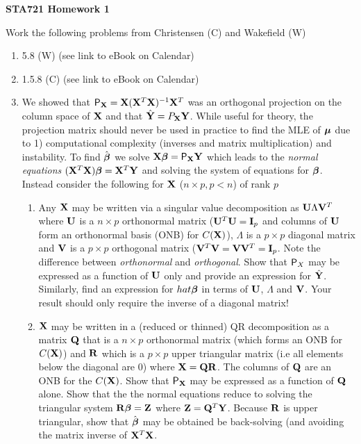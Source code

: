 \documentclass[12pt]{article}
\begin{document}
{\bf STA721 \hfill Homework 1}

\vspace{.5in}
\noindent
Work the following problems from Christensen (C) and Wakefield (W)
\begin{enumerate}
\item 5.8 (W)  (see link to eBook on Calendar)
\item 1.5.8 (C) (see link to eBook on Calendar)

\item We showed that $\P_\X = \X(\X^T\X)^{-1}\X^T$ was an orthogonal
  projection on the column space of $\X$ and that $\hat{\Y} = P_\X \Y$.
  While useful for theory, the projection matrix should never be used
  in practice to find the MLE of $\mub$ due to 1) computational
  complexity (inverses and matrix multiplication) and instability.  To
  find $\hat{\b}$ we solve $\X \b = \P_\X \Y $ which
  leads to the {\it normal equations}  $(\X^T\X) \b = \X^T\Y$ and
  solving the system of equations for $\b$.
  Instead consider the following for $\X$ ($n \times p, p < n$) of rank $p$

  \begin{enumerate}
  \item Any $\X$ may be written via a singular value decomposition as
    $\U \Lambda \V^T$ where $\U$ is a $n \times p$ orthonormal matrix
    ($\U^T\U = \I_p$ and columns of $\U$ form an orthonormal basis (ONB) for
    $C(\X)$), $\Lambda$ is a $p \times p$ diagonal matrix and $\V$ is
    a $p \times p$ orthogonal matrix ($\V^T\V = \V \V^T = \I_p$. Note
    the difference between {\it orthonormal} and {\it orthogonal}.
    Show that $\P_X$ may be expressed as a function of $\U$ only and
    provide an expression for $\hat{\Y}$.  Similarly, find an
    expression for $hat{\b}$ in terms of $\U$, $\Lambda$ and $\V$.
    Your result should only require the inverse of a diagonal matrix!
\item $\X$ may be written in a (reduced or thinned) QR decomposition as a matrix
  $\Q$ that is a $n \times p$ orthonormal matrix (which forms an ONB
  for $C(\X)$) and $\mat{R}$ which is a $p
  \times p$ upper triangular matrix (i.e all elements below the
  diagonal are 0) where $\X = \Q \mat{R}$. The columns of $\Q$ are an ONB for
  the $C(\X)$. Show that $\P_\X$
  may be expressed as a function of $\Q$ alone.   Show that  the 
 the normal equations reduce to solving the triangular system $\mat{R} \b = \Z$ where $\Z = \Q^T \Y$.
 Because $\mat{R}$ is upper triangular, show that $\hat{\b}$ may be
 obtained be back-solving (and avoiding the matrix inverse of $\X^T\X$.
   

\end{enumerate}
\end{enumerate}
\end{document}
